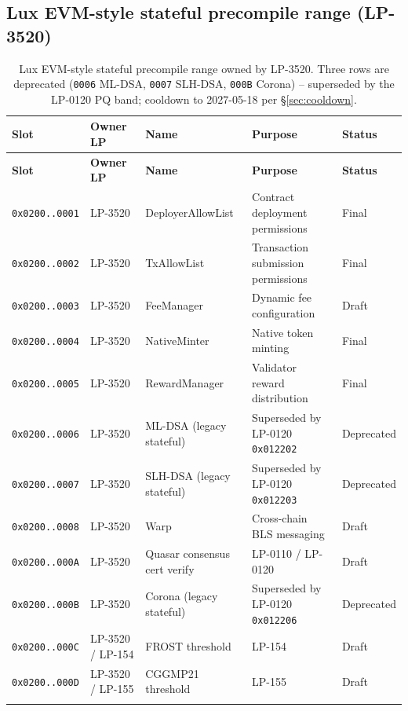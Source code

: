 \subsection{Lux EVM-style stateful precompile range (LP-3520)}

\begin{longtable}{@{}p{2.4cm}p{2.4cm}p{3.0cm}p{3.2cm}p{2.0cm}@{}}
\toprule
\textbf{Slot} & \textbf{Owner LP} & \textbf{Name} & \textbf{Purpose} & \textbf{Status} \\
\midrule
\endfirsthead
\toprule
\textbf{Slot} & \textbf{Owner LP} & \textbf{Name} & \textbf{Purpose} & \textbf{Status} \\
\midrule
\endhead
\texttt{0x0200..0001} & LP-3520 & DeployerAllowList & Contract deployment permissions & Final \\
\texttt{0x0200..0002} & LP-3520 & TxAllowList & Transaction submission permissions & Final \\
\texttt{0x0200..0003} & LP-3520 & FeeManager & Dynamic fee configuration & Draft \\
\texttt{0x0200..0004} & LP-3520 & NativeMinter & Native token minting & Final \\
\texttt{0x0200..0005} & LP-3520 & RewardManager & Validator reward distribution & Final \\
\texttt{0x0200..0006} & LP-3520 & ML-DSA (legacy stateful) & Superseded by LP-0120 \texttt{0x012202} & Deprecated \\
\texttt{0x0200..0007} & LP-3520 & SLH-DSA (legacy stateful) & Superseded by LP-0120 \texttt{0x012203} & Deprecated \\
\texttt{0x0200..0008} & LP-3520 & Warp & Cross-chain BLS messaging & Draft \\
\texttt{0x0200..000A} & LP-3520 & Quasar consensus cert verify & LP-0110 / LP-0120 & Draft \\
\texttt{0x0200..000B} & LP-3520 & Corona (legacy stateful) & Superseded by LP-0120 \texttt{0x012206} & Deprecated \\
\texttt{0x0200..000C} & LP-3520 / LP-154 & FROST threshold & LP-154 & Draft \\
\texttt{0x0200..000D} & LP-3520 / LP-155 & CGGMP21 threshold & LP-155 & Draft \\
\bottomrule
\caption{Lux EVM-style stateful precompile range owned by LP-3520.
Three rows are deprecated (\texttt{0006} ML-DSA, \texttt{0007} SLH-DSA,
\texttt{000B} Corona) -- superseded by the LP-0120 PQ band; cooldown
to 2027-05-18 per \S\ref{sec:cooldown}.}
\label{tab:precomp-lp3520}
\end{longtable}

